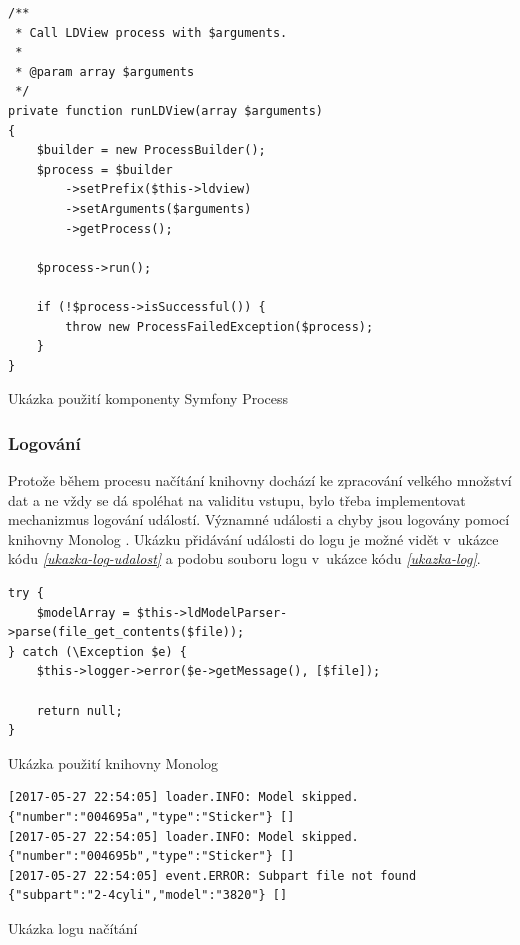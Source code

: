 \begin{listing}[htbp]
        \begin{verbatim}
/**
 * Call LDView process with $arguments.
 *
 * @param array $arguments
 */
private function runLDView(array $arguments)
{
    $builder = new ProcessBuilder();
    $process = $builder
        ->setPrefix($this->ldview)
        ->setArguments($arguments)
        ->getProcess();

    $process->run();

    if (!$process->isSuccessful()) {
        throw new ProcessFailedException($process);
    }
}
        \end{verbatim}
    \caption{Ukázka použití komponenty Symfony Process \label{ukazka-stlconverter}}
\end{listing}

\subsubsection*{Logování}
Protože během procesu načítání knihovny dochází ke zpracování velkého množství dat a ne vždy se dá spoléhat na validitu vstupu, bylo třeba implementovat mechanizmus logování událostí. Významné události a chyby jsou logovány pomocí knihovny Monolog \autocite{symfony:monolog}. Ukázku přidávání události do logu je možné vidět v~ukázce kódu \emph{\ref{ukazka-log-udalost}} a podobu souboru logu v~ukázce kódu \emph{\ref{ukazka-log}}.

\begin{listing}[htbp]
        \begin{verbatim}
try {
    $modelArray = $this->ldModelParser->parse(file_get_contents($file));
} catch (\Exception $e) {
    $this->logger->error($e->getMessage(), [$file]);

    return null;
} 
        \end{verbatim}
    \caption{Ukázka použití knihovny Monolog \label{ukazka-log-udalost}}
\end{listing}

\begin{listing}[htbp]
        \begin{verbatim}
[2017-05-27 22:54:05] loader.INFO: Model skipped. {"number":"004695a","type":"Sticker"} []
[2017-05-27 22:54:05] loader.INFO: Model skipped. {"number":"004695b","type":"Sticker"} []
[2017-05-27 22:54:05] event.ERROR: Subpart file not found {"subpart":"2-4cyli","model":"3820"} []
        \end{verbatim}
    \caption{Ukázka logu načítání\label{ukazka-log}}
\end{listing}

